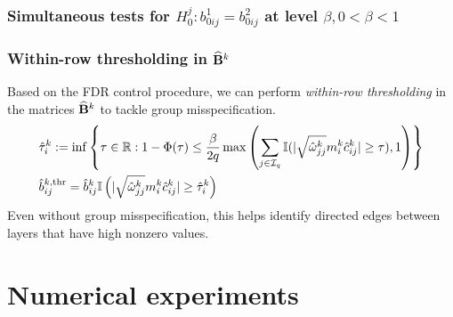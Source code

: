 \documentclass[10pt]{beamer}
\theoremstyle{definition}
\begin{document}
\begin{frame}
\frametitle{Simultaneous tests for $H_0^{j}: b_{0 ij}^1 = b_{0 ij}^2$ at level $\beta, 0< \beta < 1$}

\begin{enumerate}
\end{enumerate} 
\end{frame}

\begin{frame}
\frametitle{Within-row thresholding in $\widehat {{\mathbf{B}}}^k$}

Based on the FDR control procedure, we can perform {\it within-row thresholding} in the matrices $\widehat {{\mathbf{B}}}^k$ to tackle group misspecification.
%
\begin{align*}
& \hat \tau_i^k := \inf \left\{\tau \in {\mathbb{R}}: 1 - \Phi(\tau) \leq \frac{\beta}{2 q}
\max \left( \sum_{j \in {\cal{I}}_q} {\mathbb{I}}( | \sqrt{\hat \omega_{jj}^k} m_i^k \hat c_{ij}^k | \geq \tau), 1 \right) \right\} \notag\\
& \hat b_{ij}^{k, \text{thr}} =  \hat b_{ij}^k {\mathbb{I}} \left(
|\sqrt{\hat \omega_{jj}^k} m_i^k \hat c_{ij}^k | \geq \hat \tau_i^k \right)
\end{align*}
%
Even without group misspecification, this helps identify directed edges between layers that have high nonzero values.
\end{frame}

\section{Numerical experiments}
\end{document}
